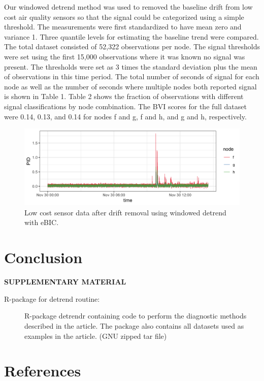 \documentclass[12pt]{article}
\begin{document}
	
	Our windowed detrend method was used to removed the baseline drift from low cost air quality sensors so that the signal could be categorized using a simple threshold. The measurements were first standardized to have mean zero and variance 1. Three quantile levels for estimating the baseline trend were compared. The total dataset consisted of 52,322 observations per node. 
	The signal thresholds were set using the first 15,000 observations where it was known no signal was present. The thresholds were set as 3 times the standard deviation plus the mean of observations in this time period. The total number of seconds of signal for each node as well as the number of seconds where multiple nodes both reported signal is shown in Table 1. Table 2 shows the fraction of observations with different signal classifications by node combination. The BVI scores for the full dataset were 0.14, 0.13, and 0.14 for nodes f and g, f and h, and g and h, respectively. 
		
	\begin{figure}
		\caption{Low cost sensor data after drift removal using windowed detrend with eBIC.}
		\includegraphics[width = \linewidth]{Figures/corrected_data.png}
	\end{figure}

		
	

	\section{Conclusion}
	\label{sec:conc}
	
	
	\bigskip
	\begin{center}
		{\large\bf SUPPLEMENTARY MATERIAL}
	\end{center}
	
	\begin{description}
		
		\item[R-package for detrend routine:] R-package detrendr containing code to perform the diagnostic methods described in the article. The package also contains all datasets used as examples in the article. (GNU zipped tar file)
				
	\end{description}
	
	\section{References}

	
	
	
	
\end{document}
